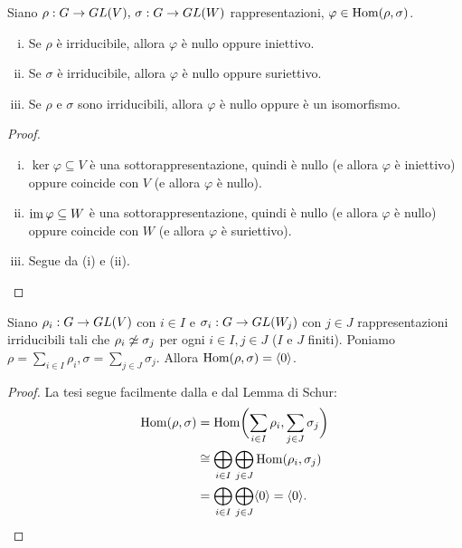 \begin{proposition}
Siano $\rho:G\to GL(V),\,\allowbreak\sigma:G\to GL(W)$ rappresentazioni, $\varphi\in\operatorname{Hom}(\rho,\sigma)$.
\begin{enumerate}[(i)]
\item Se $\rho$ è irriducibile, allora $\varphi$ è nullo oppure iniettivo.
\item Se $\sigma$ è irriducibile, allora $\varphi$ è nullo oppure suriettivo.
\item Se $\rho$ e $\sigma$ sono irriducibili, allora $\varphi$ è nullo oppure è un isomorfismo.
\end{enumerate}
\end{proposition}
\begin{proof}\leavevmode
\begin{enumerate}[(i)]
\item $\ker\varphi\subseteq V$ è una sottorappresentazione, quindi è nullo (e allora $\varphi$ è iniettivo) oppure coincide con $V$ (e allora $\varphi$ è nullo).
\item $\operatorname{im}\varphi\subseteq W$ è una sottorappresentazione, quindi è nullo (e allora $\varphi$ è nullo) oppure coincide con $W$ (e allora $\varphi$ è suriettivo).
\item Segue da (i) e (ii).
\end{enumerate}
\end{proof}

\begin{corollary}
Siano $\rho_i:G\to GL(V)$ con $i\in I$ e $\sigma_i:G\to GL(W_j)$ con $j\in J$ rappresentazioni irriducibili tali che $\rho_i\not\simeq\sigma_j$ per ogni $i\in I\comma j\in J$ ($I$ e $J$ finiti). Poniamo $\rho=\sum_{i\in I}\rho_i\comma\sigma=\sum_{j\in J}\sigma_j$. Allora $\operatorname{Hom}(\rho,\sigma)=\langle 0\rangle$.
\end{corollary}
\begin{proof}
La tesi segue facilmente dalla  e dal Lemma di Schur:
\begin{align*}
\operatorname{Hom}(\rho,\sigma)&=\operatorname{Hom}\biggl(\sum_{i\in I}\rho_i,\sum_{j\in J}\sigma_j\biggr)\\
&\cong\bigoplus_{i\in I}\bigoplus_{j\in J}\operatorname{Hom}(\rho_i,\sigma_j)\\
&=\bigoplus_{i\in I}\bigoplus_{j\in J}\langle 0\rangle=\langle 0\rangle.
\end{align*}
\end{proof}

